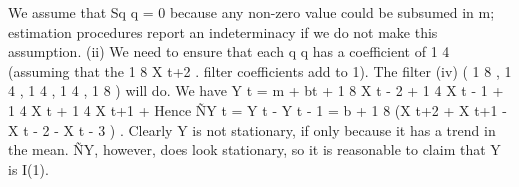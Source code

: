 We assume that Sq q = 0 because any non-zero value could be subsumed in
m; estimation procedures report an indeterminacy if we do not make this
assumption.
(ii)
We need to ensure that each q q has a coefficient of
1
4 (assuming that the
1
8 X t+2 .
filter coefficients add to 1).
The filter
(iv)
( 1 8 , 1 4 , 1 4 , 1 4 , 1 8 ) will do.
We have
Y t = m + bt +
1
8
X t - 2 +
1
4
X t - 1 +
1
4
X t +
1
4
X t+1 +
Hence
ÑY t = Y t - Y t - 1 = b +
1
8
(X t+2 + X t+1 - X t - 2 - X t - 3 ) .
Clearly Y is not stationary, if only because it has a trend in the mean.
ÑY, however, does look stationary, so it is reasonable to claim that Y is
I(1).
